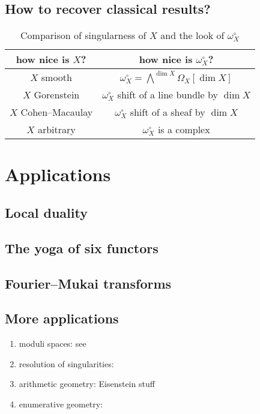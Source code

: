 \documentclass[10pt,a4paper]{article}
\begin{document}
\subsection{How to recover classical results?}
\label{subsection:classical-results}

\begin{table}[p]
  \centering
  \begin{tabular}{cc}
    \toprule
    how nice is $X$? & how nice is $\omega_X^\circ$? \\\midrule
    $X$ smooth & $\omega_X^\circ=\bigwedge^{\dim X}\Omega_X[\dim X]$ \\
    $X$ Gorenstein & $\omega_X^\circ$ shift of a line bundle by $\dim X$ \\
    $X$ Cohen--Macaulay & $\omega_X^\circ$ shift of a sheaf by $\dim X$ \\
    $X$ arbitrary & $\omega_X^\circ$ is a complex \\
    \bottomrule
  \end{tabular}
  \caption{Comparison of singularness of $X$ and the look of $\omega_X^\circ$}
  \label{table:comparison-X-dualising-sheaf}
\end{table}


\section{Applications}
\label{section:applications-grothendieck-duality}
\subsection{Local duality}
\label{subsection:local-duality}

\subsection{The yoga of six functors}
\label{subsection:six-functors-yoga}

\subsection{Fourier--Mukai transforms}
\label{subsection:fourier-mukai-transforms}

\subsection{More applications}
\begin{enumerate}
  \item moduli spaces: see \cite{deligne-mumford-irreducibility-moduli-of-curves}
  \item resolution of singularities: \addreference
  \item arithmetic geometry: Eisenstein stuff \addreference
  \item enumerative geometry: \addreference
\end{enumerate}

\printbibliography
\end{document}
